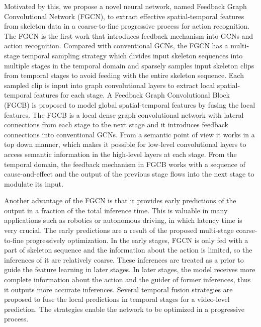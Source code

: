 \documentclass[runningheads]{llncs}
\begin{document}
Motivated by this, we propose a novel neural network, named Feedback Graph Convolutional Network (FGCN), to extract effective spatial-temporal features from skeleton data in a coarse-to-fine progressive process for action recognition. The FGCN is the first work that introduces feedback mechanism into GCNs and action recognition. Compared with conventional GCNs, the FGCN has a multi-stage temporal sampling strategy which divides input skeleton sequences into multiple stages in the temporal domain and sparsely samples input skeleton clips from temporal stages to avoid feeding with the entire skeleton sequence. Each sampled clip is input into graph convolutional layers to extract local spatial-temporal features for each stage. 
A Feedback Graph Convolutional Block (FGCB) is proposed to model global spatial-temporal features by fusing the local features. The FGCB is a local dense graph convolutional network with lateral connections from each stage to the next stage and it introduces feedback connections into conventional GCNs. From a semantic point of view it works in a top down manner, which makes it possible for low-level convolutional layers to access semantic information in the high-level layers at each stage. From the temporal domain, the feedback mechanism in FGCB works with a sequence of cause-and-effect and the output of the previous stage flows into the next stage to modulate its input.

Another advantage of the FGCN is that it provides early predictions of the output in a fraction of the total inference time. This is valuable in many applications such as robotics or autonomous driving, in which latency time is very crucial.
The early predictions are a result of the proposed multi-stage coarse-to-fine progressively optimization. In the early stages, FGCN is only fed with a part of skeleton sequence and the information about the action is limited, so the inferences of it are relatively coarse. These inferences are treated as a prior to guide the feature learning in later stages. In later stages, the model receives more complete information about the action and the guider of former inferences, thus it outputs more accurate inferences. Several temporal fusion strategies are proposed to fuse the local predictions in temporal stages for a video-level prediction. The strategies enable the network to be optimized in a progressive process.
\end{document}
